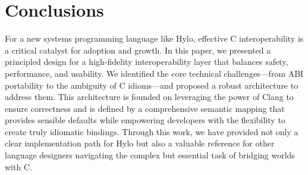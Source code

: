 \section{Conclusions}

For a new systems programming language like Hylo, effective C interoperability is a critical catalyst for adoption and growth. In this paper, we presented a principled design for a high-fidelity interoperability layer that balances safety, performance, and usability. We identified the core technical challenges—from ABI portability to the ambiguity of C idioms—and proposed a robust architecture to address them. This architecture is founded on leveraging the power of Clang to ensure correctness and is defined by a comprehensive semantic mapping that provides sensible defaults while empowering developers with the flexibility to create truly idiomatic bindings. Through this work, we have provided not only a clear implementation path for Hylo but also a valuable reference for other language designers navigating the complex but essential task of bridging worlds with C.

